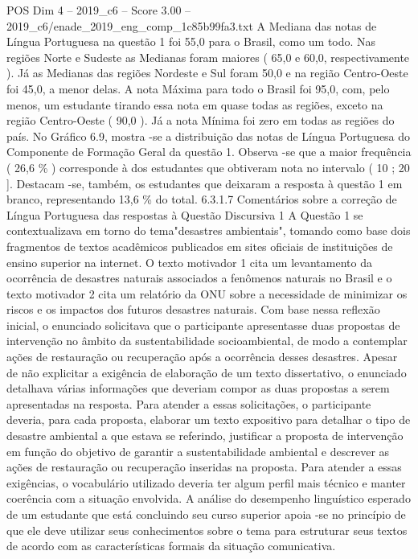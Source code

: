 \begin{textsample}{POS Dim 4 – 2019\_c6 – Score 3.00 – 2019\_c6/enade\_2019\_eng\_comp\_1c85b99fa3.txt}
A Mediana das notas de Língua Portuguesa na questão 1 foi 55,0 para o Brasil, como um todo.
Nas regiões Norte e Sudeste as Medianas foram maiores ( 65,0 e 60,0, respectivamente ).
Já as Medianas das regiões Nordeste e Sul foram 50,0 e na região Centro-Oeste foi 45,0, a menor delas.
A nota Máxima para todo o Brasil foi 95,0, com, pelo menos, um estudante tirando essa nota em quase todas as regiões, exceto na região Centro-Oeste ( 90,0 ).
Já a nota Mínima foi zero em todas as regiões do país.
No Gráfico 6.9, mostra -se a distribuição das notas de Língua Portuguesa do Componente de Formação Geral da questão 1.
Observa -se que a maior frequência ( 26,6 \% ) corresponde à dos estudantes que obtiveram nota no intervalo ( 10 ; 20 ].
Destacam -se, também, os estudantes que deixaram a resposta à questão 1 em branco, representando 13,6 \% do total. 6.3.1.7 Comentários sobre a correção de Língua Portuguesa das respostas à Questão Discursiva 1 A Questão 1 se contextualizava em torno do tema"desastres ambientais", tomando como base dois fragmentos de textos acadêmicos publicados em sites oficiais de instituições de ensino superior na internet.
O texto motivador 1 cita um levantamento da ocorrência de desastres naturais associados a fenômenos naturais no Brasil e o texto motivador 2 cita um relatório da ONU sobre a necessidade de minimizar os riscos e os impactos dos futuros desastres naturais.
Com base nessa reflexão inicial, o enunciado solicitava que o participante apresentasse duas propostas de intervenção no âmbito da sustentabilidade socioambiental, de modo a contemplar ações de restauração ou recuperação após a ocorrência desses desastres.
Apesar de não explicitar a exigência de elaboração de um texto dissertativo, o enunciado detalhava várias informações que deveriam compor as duas propostas a serem apresentadas na resposta.
Para atender a essas solicitações, o participante deveria, para cada proposta, elaborar um texto expositivo para detalhar o tipo de desastre ambiental a que estava se referindo, justificar a proposta de intervenção em função do objetivo de garantir a sustentabilidade ambiental e descrever as ações de restauração ou recuperação inseridas na proposta.
Para atender a essas exigências, o vocabulário utilizado deveria ter algum perfil mais técnico e manter coerência com a situação envolvida.
A análise do desempenho linguístico esperado de um estudante que está concluindo seu curso superior apoia -se no princípio de que ele deve utilizar seus conhecimentos sobre o tema para estruturar seus textos de acordo com as características formais da situação comunicativa.

\end{textsample}
